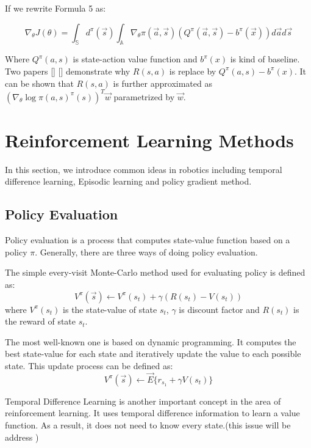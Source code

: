 \documentclass[officiallayout]{tktla}
\begin{document}
If we rewrite Formula 5 as:

\begin{equation}
\nabla_\theta J(\theta) = \int_\mathbb{S} d^\pi(\vec{s})\int_\mathbb{A}\nabla_\theta \pi(\vec{a}, \vec{s})(Q^\pi(\vec{a}, \vec{s}) -b^\pi(\vec{x}))d\vec{a}d\vec{s}
\end{equation}



Where $Q^\pi(a, s)$ is state-action value function and $b^\pi(x)$ is kind of baseline. Two
papers [] [] demonstrate why $R(s, a)$ is replace by $Q^\pi(a, s) - b^\pi(x)$. It can be
shown that $R(s, a)$ is further approximated as $(\nabla_\theta \log\pi(a,s)^\pi(s))^T \vec{w}$ parametrized by $\vec{w}$.
\section{Reinforcement Learning Methods}

In this section, we introduce common ideas in robotics including temporal difference learning, Episodic learning and policy gradient method.
\subsection{Policy Evaluation}
Policy evaluation is a process that computes state-value function based on a policy $\pi$. Generally, there are three ways of doing policy evaluation. 

The simple every-visit Monte-Carlo method used for evaluating policy is defined as:
\begin{equation}
V^\pi(\vec{s}) \leftarrow V^\pi(s_t) + \gamma (R(s_t) - V(s_t))
\end{equation}
where $V^\pi(s_t)$ is the state-value of state $s_t$, $\gamma$ is discount factor and $R(s_t)$ is the reward of state $s_t$. 

The most well-known one is based on dynamic programming. It computes the best state-value for each state and iteratively update the value to each possible state. This update process can be defined as:
\begin{equation}
V^\pi(\vec{s}) \leftarrow \vec{E}\{r_{s_1} + \gamma V(s_t)\}
\end{equation}

Temporal Difference Learning is another important concept in the area of reinforcement learning. It uses temporal difference information to learn a value function. As a result, it does not need to know every state.(this issue will be address )
\end{document}
